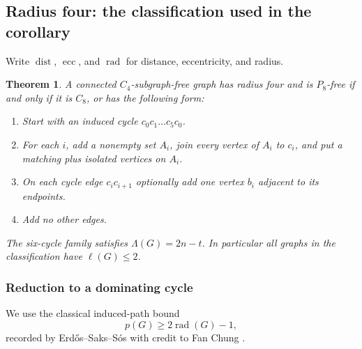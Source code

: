 \documentclass[11pt,a4paper]{article}
\newtheorem{theorem}{Theorem}[section]
\theoremstyle{definition}\newtheorem{definition}[theorem]{Definition}
\theoremstyle{remark}\newtheorem{remark}[theorem]{Remark}
\begin{document}
\subsection{Radius four: the classification used in the corollary}
Write $\operatorname{dist}$, $\operatorname{ecc}$, and $\operatorname{rad}$
for distance, eccentricity, and radius.
\begin{theorem}\label{local15:r4:thm:main}
A connected $C_4$-subgraph-free graph has radius four and is $P_8$-free if
and only if it is $C_8$, or has the following form:
\begin{enumerate}[label=\textup{(\roman*)}]
\item Start with an induced cycle $c_0c_1\dots c_5c_0$.
\item For each $i$, add a nonempty set $A_i$, join every vertex of $A_i$
to $c_i$, and put a matching plus isolated vertices on $A_i$.
\item On each cycle edge $c_ic_{i+1}$ optionally add one vertex $b_i$
adjacent to its endpoints.
\item Add no other edges.
\end{enumerate}
The six-cycle family satisfies $\Lambda(G)=2n-t$. In particular all graphs in
the classification have $\ell(G)\le2$.
\end{theorem}
\subsubsection{Reduction to a dominating cycle}
We use the classical induced-path bound
\begin{equation}\label{local15:r4:eq:radius}
 p(G)\ge2\operatorname{rad}(G)-1,
\end{equation}
recorded by Erd\H{o}s--Saks--S\'os with credit to Fan Chung
\cite[Section II, pp.~64--65]{src:ess}.
\end{document}
